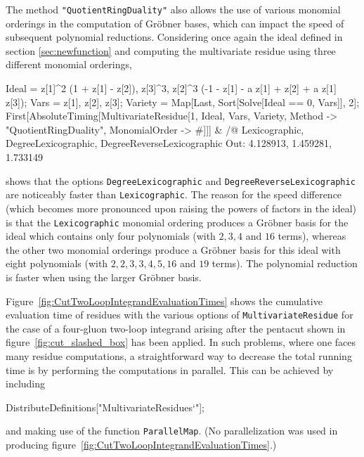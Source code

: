 \documentclass[dvipsnames,preprint,12pt,sort&compress]{elsarticle}
\newcommand{\Math}[1]
{\lstinline[style=Mathematica,breaklines=false,basicstyle=\small \ttfamily\null]~#1~}
\begin{document}
The method \Math{"QuotientRingDuality"} also allows the use of various monomial orderings in the computation of Gr{\"o}bner bases, which can impact the speed of subsequent polynomial reductions.
Considering once again the ideal defined in section \ref{sec:newfunction} and computing the multivariate residue using three different monomial orderings,
\begin{CodeSample}
Ideal = {z[1]^2 (1 + z[1] - z[2]), z[3]^3,
   		z[2]^3 (-1 - z[1] - a z[1] + z[2] + a z[1] z[3])};
Vars = {z[1], z[2], z[3]};
Variety = Map[Last, Sort[Solve[Ideal == 0, Vars]], {2}];
First[AbsoluteTiming[MultivariateResidue[1, Ideal, Vars, Variety, Method -> "QuotientRingDuality", MonomialOrder -> #]]] & /@ {Lexicographic, DegreeLexicographic, DegreeReverseLexicographic}
Out: {4.128913, 1.459281, 1.733149}
\end{CodeSample}
shows that the options \Math{DegreeLexicographic} and \Math{DegreeReverseLexicographic} are noticeably faster than \Math{Lexicographic}.
The reason for the speed difference (which becomes more pronounced upon raising the powers of factors in the ideal) is that the \Math{Lexicographic} monomial ordering produces a Gr{\"o}bner basis for the ideal which contains only four polynomials (with $2, 3, 4$ and $16$ terms), whereas the other two monomial orderings produce a Gr{\"o}bner basis for this ideal with eight polynomials (with $2, 2, 3, 3, 4, 5, 16$ and $19$ terms).
The polynomial reduction is faster when using the larger Gr{\"o}bner basis.

Figure~\ref{fig:CutTwoLoopIntegrandEvaluationTimes} shows the cumulative evaluation time of residues with the various options of \Math{MultivariateResidue} for the case of a four-gluon two-loop integrand arising after the pentacut shown in figure~\ref{fig:cut_slashed_box} has been applied.
In such problems, where one faces many residue computations, a straightforward way to decrease the total running time is by performing the computations in parallel. This can be achieved by including
\begin{CodeSample}
DistributeDefinitions["MultivariateResidues`"];
\end{CodeSample}
and making use of the function \Math{ParallelMap}.
(No parallelization was used in producing figure~\ref{fig:CutTwoLoopIntegrandEvaluationTimes}.)
\end{document}
